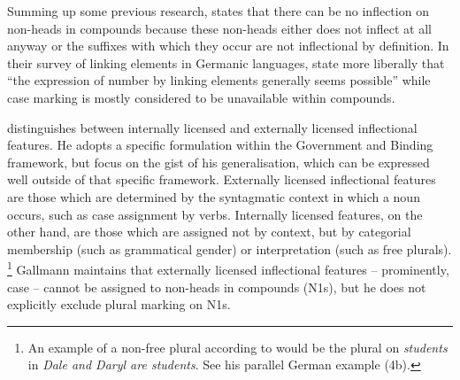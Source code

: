 Summing up some previous research, \textcite[9]{Schluecker2012} states that there can be no inflection on non-heads in compounds because these non-heads either does not inflect at all anyway or the suffixes with which they occur are not inflectional by definition.
In their survey of linking elements in Germanic languages, \textcite[577]{FuhrhopKuerschner2015} state more liberally that ``the expression of number by linking elements generally seems possible'' while case marking is mostly considered to be unavailable within compounds.

\textcite[178--180]{Gallmann1998} distinguishes between internally licensed and externally licensed inflectional features.
He adopts a specific formulation within the Government and Binding framework, but focus on the gist of his generalisation, which can be expressed well outside of that specific framework.
Externally licensed inflectional features are those which are determined by the syntagmatic context in which a noun occurs, such as case assignment by verbs.
Internally licensed features, on the other hand, are those which are assigned not by context, but by categorial membership (such as grammatical gender) or interpretation (such as free plurals).%
\footnote{An example of a non-free plural according to \textcite[179]{Gallmann1998} would be the plural on \textit{students} in \textit{Dale and Daryl are students}.
See his parallel German example (4b).
}
Gallmann maintains that externally licensed inflectional features -- prominently, case -- cannot be assigned to non-heads in compounds (N1s), but he does not explicitly exclude plural marking on N1s.


